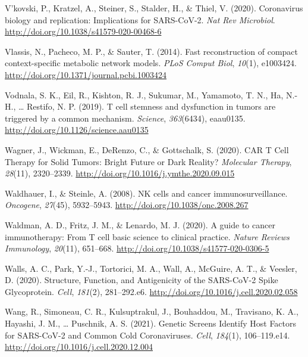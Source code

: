 \documentclass[12pt,twoside,openany,\mydriver]{thesis}  %
\begin{document}
\leavevmode\hypertarget{ref-vkovski_coronavirus_2020}{}%
V'kovski, P., Kratzel, A., Steiner, S., Stalder, H., \& Thiel, V. (2020). Coronavirus biology and replication: Implications for SARS-CoV-2. \emph{Nat Rev Microbiol}. \url{http://doi.org/10.1038/s41579-020-00468-6}

\leavevmode\hypertarget{ref-vlassis_fast_2014}{}%
Vlassis, N., Pacheco, M. P., \& Sauter, T. (2014). Fast reconstruction of compact context-specific metabolic network models. \emph{PLoS Comput Biol}, \emph{10}(1), e1003424. \url{http://doi.org/10.1371/journal.pcbi.1003424}

\leavevmode\hypertarget{ref-vodnala_t_2019}{}%
Vodnala, S. K., Eil, R., Kishton, R. J., Sukumar, M., Yamamoto, T. N., Ha, N.-H., \ldots{} Restifo, N. P. (2019). T cell stemness and dysfunction in tumors are triggered by a common mechanism. \emph{Science}, \emph{363}(6434), eaau0135. \url{http://doi.org/10.1126/science.aau0135}

\leavevmode\hypertarget{ref-wagner_car_2020}{}%
Wagner, J., Wickman, E., DeRenzo, C., \& Gottschalk, S. (2020). CAR T Cell Therapy for Solid Tumors: Bright Future or Dark Reality? \emph{Molecular Therapy}, \emph{28}(11), 2320--2339. \url{http://doi.org/10.1016/j.ymthe.2020.09.015}

\leavevmode\hypertarget{ref-waldhauer_nk_2008}{}%
Waldhauer, I., \& Steinle, A. (2008). NK cells and cancer immunosurveillance. \emph{Oncogene}, \emph{27}(45), 5932--5943. \url{http://doi.org/10.1038/onc.2008.267}

\leavevmode\hypertarget{ref-waldman_guide_2020}{}%
Waldman, A. D., Fritz, J. M., \& Lenardo, M. J. (2020). A guide to cancer immunotherapy: From T cell basic science to clinical practice. \emph{Nature Reviews Immunology}, \emph{20}(11), 651--668. \url{http://doi.org/10.1038/s41577-020-0306-5}

\leavevmode\hypertarget{ref-walls_structure_2020}{}%
Walls, A. C., Park, Y.-J., Tortorici, M. A., Wall, A., McGuire, A. T., \& Veesler, D. (2020). Structure, Function, and Antigenicity of the SARS-CoV-2 Spike Glycoprotein. \emph{Cell}, \emph{181}(2), 281--292.e6. \url{http://doi.org/10.1016/j.cell.2020.02.058}

\leavevmode\hypertarget{ref-wang_genetic_2021}{}%
Wang, R., Simoneau, C. R., Kulsuptrakul, J., Bouhaddou, M., Travisano, K. A., Hayashi, J. M., \ldots{} Puschnik, A. S. (2021). Genetic Screens Identify Host Factors for SARS-CoV-2 and Common Cold Coronaviruses. \emph{Cell}, \emph{184}(1), 106--119.e14. \url{http://doi.org/10.1016/j.cell.2020.12.004}
\end{document}
